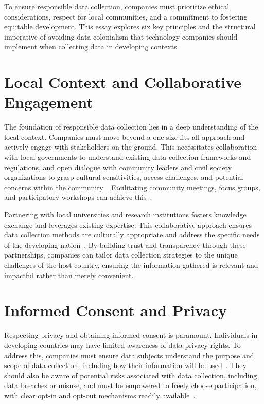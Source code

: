 \documentclass[11pt,showkeys]{essay}
\begin{document}
To ensure responsible data collection, companies must prioritize ethical considerations, respect for local communities, and a commitment to fostering equitable development. This essay explores six key principles and the structural imperative of avoiding data colonialism that technology companies should implement when collecting data in developing contexts.

\section{Local Context and Collaborative Engagement}

The foundation of responsible data collection lies in a deep understanding of the local context. Companies must move beyond a one-size-fits-all approach and actively engage with stakeholders on the ground. This necessitates collaboration with local governments to understand existing data collection frameworks and regulations, and open dialogue with community leaders and civil society organizations to grasp cultural sensitivities, access challenges, and potential concerns within the community~\cite{runde_innovative_2022}. Facilitating community meetings, focus groups, and participatory workshops can achieve this~\cite{grimmelikhuijsen_explaining_2022}.

Partnering with local universities and research institutions fosters knowledge exchange and leverages existing expertise. This collaborative approach ensures data collection methods are culturally appropriate and address the specific needs of the developing nation~\cite{goldberg_world_2020}. By building trust and transparency through these partnerships, companies can tailor data collection strategies to the unique challenges of the host country, ensuring the information gathered is relevant and impactful rather than merely convenient.

\section{Informed Consent and Privacy}

Respecting privacy and obtaining informed consent is paramount. Individuals in developing countries may have limited awareness of data privacy rights. To address this, companies must ensure data subjects understand the purpose and scope of data collection, including how their information will be used~\cite{ohm_broken_2010}. They should also be aware of potential risks associated with data collection, including data breaches or misuse, and must be empowered to freely choose participation, with clear opt-in and opt-out mechanisms readily available~\cite{ohm_broken_2010}.
\end{document}
